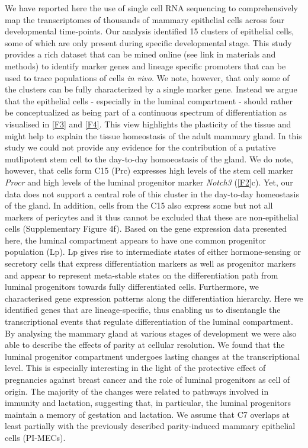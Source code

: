 \documentclass[titlepage, 12pt, oneside]{amsart}
\begin{document}
We have reported here the use of single cell RNA sequencing to comprehensively map the transcriptomes of thousands of mammary epithelial cells across four developmental time-points.
Our analysis identified 15 clusters of epithelial cells, some of which are only present during specific developmental stage.
This study provides a rich dataset that can be mined online (see link in materials and methods) to identify marker genes and lineage specific promoters that can be used to trace populations of cells \textit{in vivo}.
We note, however, that only some of the clusters can be fully characterized by a single marker gene.
Instead we argue that the epithelial cells - especially in the luminal compartment - should rather be conceptualized as being part of a continuous spectrum of differentiation as visualised in \autoref{F3} and \autoref{F4}.
This view highlights the plasticity of the tissue and might help to explain the tissue homeostasis of the adult mammary gland\autocite{Inman2015}.
In this study we could not provide any evidence for the contribution of a putative mutlipotent stem cell to the day-to-day homoeostasis of the gland.
We do note, however, that cells form C15 (Prc) expresses high levels of the stem cell marker \textit{Procr}\autocite{Wang2015} and high levels of the luminal progenitor marker \textit{Notch3}\autocite{Lafkas2013} (\autoref{F2}c).
Yet, our data does not support a central role of this cluster in the day-to-day homeostasis of the gland. 
In addition, cells from the C15 also express some but not all markers of pericytes and it thus cannot be excluded that these are non-epithelial cells (Supplementary Figure 4f). 
Based on the gene expression data presented here, the luminal compartment appears to have one common progenitor population (Lp).
Lp gives rise to intermediate states of either hormone-sensing or secretory cells that express differentiation markers as well as progenitor markers and appear to represent meta-stable states on the differentiation path from luminal progenitors towards fully differentiated cells.
Furthermore, we characterised gene expression patterns along the differentiation hierarchy.
Here we identified genes that are lineage-specific, thus enabling us to disentangle the transcriptional events that regulate differentiation of the luminal compartment.
By analysing the mammary gland at various stages of development we were also able to describe the effects of parity at cellular resolution.
We found that the luminal progenitor compartment undergoes lasting changes at the transcriptional level.
This is especially interesting in the light of the protective effect of pregnancies against breast cancer and the role of luminal progenitors as cell of origin.
The majority of the changes were related to pathways involved in immunity and lactation, suggesting that, in particular, the luminal progenitors maintain a memory of gestation and lactation.
We assume that C7 overlaps at least partially with the previously described parity-induced mammary epithelial cells (PI-MECs)\autocite{Wagner2002}.
\end{document}
